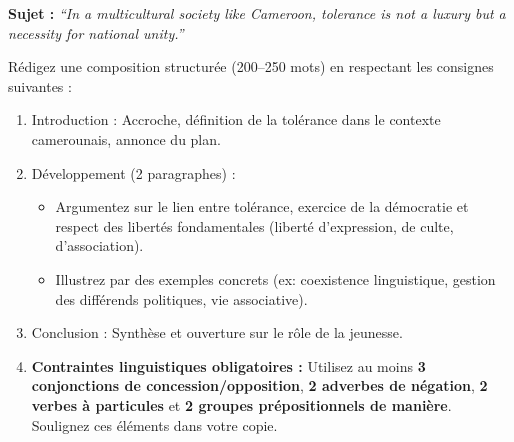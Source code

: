 \documentclass[11pt]{article}
\begin{document}
\begin{exercice}
\textbf{Sujet :} \textit{``In a multicultural society like Cameroon, tolerance is not a luxury but a necessity for national unity.''}

Rédigez une composition structurée (200--250 mots) en respectant les consignes suivantes :
\begin{enumerate}
\item Introduction : Accroche, définition de la tolérance dans le contexte camerounais, annonce du plan.
\item Développement (2 paragraphes) :
      \begin{itemize}
      \item Argumentez sur le lien entre tolérance, exercice de la démocratie et respect des libertés fondamentales (liberté d'expression, de culte, d'association).
      \item Illustrez par des exemples concrets (ex: coexistence linguistique, gestion des différends politiques, vie associative).
      \end{itemize}
\item Conclusion : Synthèse et ouverture sur le rôle de la jeunesse.
\item \textbf{Contraintes linguistiques obligatoires :} Utilisez au moins \textbf{3 conjonctions de concession/opposition}, \textbf{2 adverbes de négation}, \textbf{2 verbes à particules} et \textbf{2 groupes prépositionnels de manière}. Soulignez ces éléments dans votre copie.
\end{enumerate}
\end{exercice}
\end{document}
